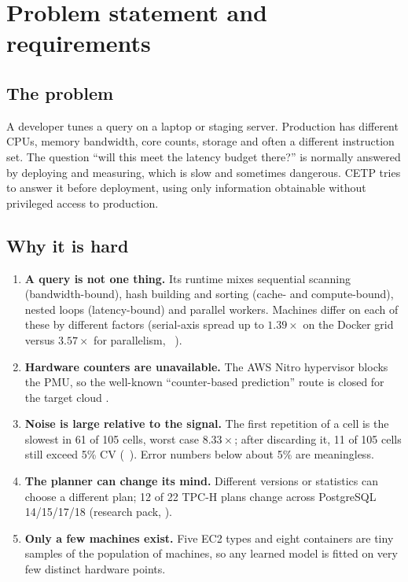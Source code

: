 \chapter{Problem statement and requirements}\label{ch:problem}

\section{The problem}
A developer tunes a query on a laptop or staging server. Production has different CPUs, memory
bandwidth, core counts, storage and often a different instruction set. The question ``will this meet
the latency budget there?'' is normally answered by deploying and measuring, which is slow and
sometimes dangerous. CETP tries to answer it before deployment, using only information obtainable
without privileged access to production.

\section{Why it is hard}
\begin{enumerate}
\item \textbf{A query is not one thing.} Its runtime mixes sequential scanning (bandwidth-bound), hash
  building and sorting (cache- and compute-bound), nested loops (latency-bound) and parallel workers.
  Machines differ on each of these by different factors (serial-axis spread up to $1.39\times$ on the Docker
  grid versus $3.57\times$ for parallelism, \evFILE\ ).
\item \textbf{Hardware counters are unavailable.} The AWS Nitro hypervisor blocks the PMU, so the
  well-known ``counter-based prediction'' route is closed for the target cloud \evCLAIM.
\item \textbf{Noise is large relative to the signal.} The first repetition of a cell is the slowest in
  61 of 105 cells, worst case $8.33\times$; after discarding it, 11 of 105 cells still exceed 5\% CV
  (\evFILE\ ). Error numbers below about 5\% are meaningless.
\item \textbf{The planner can change its mind.} Different versions or statistics can choose a different
  plan; 12 of 22 TPC-H plans change across PostgreSQL 14/15/17/18 (research pack, \evPACK).
\item \textbf{Only a few machines exist.} Five EC2 types and eight containers are tiny samples of the
  population of machines, so any learned model is fitted on very few distinct hardware points.
\end{enumerate}

